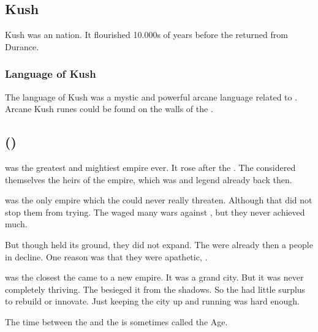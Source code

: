 \subsection{Kush}
Kush was an \ophidian nation. 
It flourished 10.000s of years before the \dragons returned from Durance. 





\subsubsection{Language of Kush}
The language of Kush was a mystic and powerful arcane language related to . 
Arcane Kush runes could be found on the walls of the . 









\subsection{\Saphyrae ()}
\index{\Saphyrae}
\Saphyrae{} was the greatest and mightiest \quiljaaran{} empire ever. 
It rose after the \firstbanewar. 
The \Saphyraeans{} considered themselves the heirs of the \ophidian{} empire, which was  and legend already back then. 

\Saphyrae{} was the only \quiljaaran{} empire which the \aryothim{} could never really threaten. 
Although that did not stop them from trying. 
The \aryothim{} waged many wars against \Saphyrae, but they never achieved much. 

But though \Saphyrae{} held its ground, they did not expand. 
The \quiljaaran{} were already then a people in decline. 
One reason was that they were apathetic, . 

\Saphyrae was the closest the \ophidians came to a new empire. 
It was a grand city.
But it was never completely thriving. 
The \noggyaleth besieged it from the shadows. 
So the \ophidians had little surplus to rebuild or innovate. 
Just keeping the city up and running was hard enough. 

The time between the \firstbanewar{} and the  is sometimes called the \Saphyraean{} Age. 


